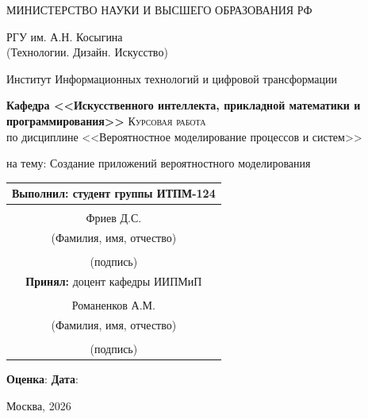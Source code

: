 \documentclass[14pt,a4paper]{extarticle}
\begin{document}
\begin{titlepage}

\begin{center}
	{\large
МИНИСТЕРСТВО НАУКИ И ВЫСШЕГО ОБРАЗОВАНИЯ РФ

		РГУ им. А.Н. Косыгина \\ (Технологии. Дизайн. Искусство)

		\bigskip

		Институт Информационных технологий и цифровой трансформации
	}

	\bigskip



	\textbf{Кафедра <<Искусственного интеллекта, прикладной математики и программирования>>}
	\bigskip
	\vfill \textsc{\Large Курсовая работа} \\
	{\large по дисциплине <<Вероятностное моделирование процессов и систем>>}

	\bigskip

	на тему: Создание приложений вероятностного моделирования
\end{center}

\vspace*{1.5cm}

\hfill
\begin{minipage}{.6\linewidth}
	\begin{tabular}{c}
		\textbf{Выполнил:} студент группы ИТПМ-124    \\\hline \\[.3cm]
		{\large Фриев Д.С.}                       \\ \hline \scriptsize{(Фамилия, имя, отчество)}
		\\[.3cm] \\ \hline
		\scriptsize{(подпись)}                       \\[.3cm]
		\textbf{Принял: }\hfill доцент кафедры ИИПМиП \\\hline
		\\[.3cm]
		Романенков А.М.                             \\ \hline
		\scriptsize{(Фамилия, имя, отчество)}
		\\[.3cm] \\ \hline
		\scriptsize{(подпись)}
	\end{tabular}
	\vspace*{1cm}
\end{minipage}

\centerline{\textbf{Оценка}: \hspace*{8cm} \textbf{Дата}: \hspace*{2cm}}
\vspace*{1cm}
\centerline{Москва, 2026}

\end{titlepage}
\clearpage
\tableofcontents
\clearpage
\end{document}
